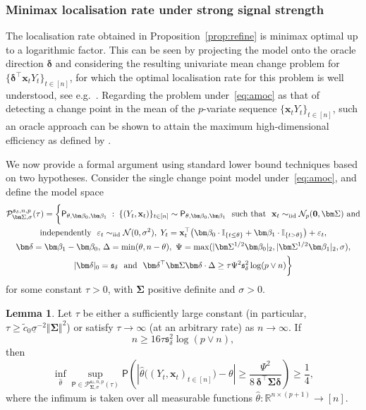 \documentclass[11pt, a4paper]{article}
\newcommand{\mbf}{\mathbf}
\newcommand{\mc}{\mathcal}
\newcommand{\vep}{\varepsilon}
\def\wh{\widehat}
\def\wt{\widetilde}
\newcommand{\cp}{\theta}
\newcommand{\p}{\mathsf{P}}
\newcommand{\iid}{\text{\upshape iid}}
\theoremstyle{definition}
\theoremstyle{definition}
\theoremstyle{definition}
\newtheorem{lem}[thm]{Lemma}
\theoremstyle{definition}
\theoremstyle{definition}
\theoremstyle{remark}
\theoremstyle{definition}
\theoremstyle{definition}
\theoremstyle{definition}
\begin{document}
{

\subsubsection{Minimax localisation rate under strong signal strength}\label{ss:opt:loc}

The localisation rate obtained in Proposition~\ref{prop:refine} is minimax optimal up to a logarithmic factor. This can be seen by projecting the model onto the oracle direction $\bm\delta$ and considering the resulting univariate mean change problem for $\{\bm \delta^\top \mbf x_t Y_t\}_{t\in [n]}$, for which the optimal localisation rate for this problem is well understood, see e.g.~\citet{VeFrLeRe23}.
{Regarding the problem under~\eqref{eq:amoc} as that of detecting a change point in the mean of the $p$-variate sequence $\{\mbf x_t Y_t \}_{t \in [n]}$, such an oracle approach can be shown to attain the maximum high-dimensional efficiency as defined by \cite{aston2018high}.}

We now provide a formal argument using standard lower bound techniques based on
two hypotheses. Consider the single change point model under~\eqref{eq:amoc}, and define the model space
\begin{multline*}
\mc P_{\bm\Sigma, \sigma}^{\mathfrak{s}_{\delta}, n, p}(\tau) = \biggl\{ \p_{\cp, \bm\beta_0, \bm\beta_1} \;:\; \{(Y_t, \mbf x_t)\}_{t \in [n]} \sim \p_{\cp, \bm\beta_0, \bm\beta_1} \text{ \ such that \ } \mbf x_t \sim_{\iid} \mc N_p(\mbf 0, \bm\Sigma) \text{ and}\\
\text{independently \ }  \vep_t \sim_{\iid}\mc N (0,\sigma^2), \; 
Y_t = \mbf x_t^\top \bigl( \bm\beta_0 \cdot \mathbb{I}_{\{t \le \cp\}} + \bm\beta_1 \cdot \mathbb{I}_{\{t > \cp\}} \bigr) + \vep_t,
\\
\bm\delta = \bm\beta_1 - \bm\beta_0, \,
\Delta = \min(\cp, n - \cp), \,
 \, \Psi = \max(\vert \bm\Sigma^{1/2} \bm\beta_0 \vert_2, \vert \bm\Sigma^{1/2} \bm\beta_1 \vert_2, \sigma), 
\\
\lvert \bm\delta\rvert_0 = \mathfrak{s}_{\delta}
\text{ \ and \ } \bm\delta^\top \bm\Sigma \bm\delta \cdot \Delta \ge \tau \Psi^2 \mathfrak{s}_\delta^2 \log(p \vee n)\biggr\}
\end{multline*} 
for some constant $\tau > 0$, with $\bm\Sigma$ positive definite and $\sigma > 0$.

\begin{lem}
Let $\tau$ be either a sufficiently large constant  (in particular, $\tau \ge \wt{c}_0  \underline{\sigma}^{-2} \Vert \bm\Sigma \Vert^2$) or satisfy $\tau \to \infty$ (at an arbitrary rate) as $n\to\infty$. If
\begin{equation}\label{s:sz:n}
n \ge 16 \tau \mathfrak{s}_{\delta}^2\log(p \vee n),
\end{equation}
then 
\[
\inf_{\wh\cp} \sup_{\p \in \mc P_{\bm\Sigma, \sigma}^{\mathfrak{s}_{\delta}, n, p}(\tau)}
\p\!\left(\left|\wh\cp\bigl((Y_t, \mbf x_t)_{t\in[n]}\bigr) - \cp\right| 
\ge \frac{\Psi^2}{8\,\bm\delta^\top \bm\Sigma \bm\delta} \right)
\ge \frac{1}{4},
\]
where the infimum is taken over all measurable functions $\wh\cp:\mathbb{R}^{n \times (p + 1)}\to [n]$.
\end{lem}

}
\end{document}
